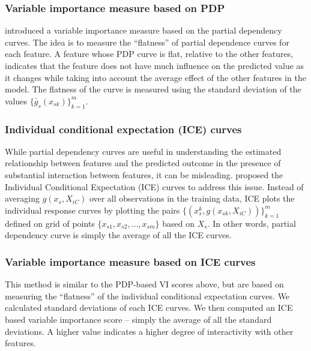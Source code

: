 \documentclass[11pt,a4paper,]{article}
\begin{document}
\subsubsection{Variable importance measure based on
PDP}\label{variable-importance-measure-based-on-pdp}

\textcite{Greenwell2018} introduced a variable importance measure based
on the partial dependency curves. The idea is to measure the
``flatness'' of partial dependence curves for each feature. A feature
whose PDP curve is flat, relative to the other features, indicates that
the feature does not have much influence on the predicted value as it
changes while taking into account the average effect of the other
features in the model. The flatness of the curve is measured using the
standard deviation of the values \(\{\bar{g}_{s}(x_{sk})\}_{k=1}^{m}\).

\subsubsection{Individual conditional expectation (ICE)
curves}\label{individual-conditional-expectation-ice-curves}

While partial dependency curves are useful in understanding the
estimated relationship between features and the predicted outcome in the
presence of substantial interaction between features, it can be
misleading. \textcite{goldstein2015peeking} proposed the Individual
Conditional Expectation (ICE) curves to address this issue. Instead of
averaging \(g(x_s, X_{iC})\) over all observations in the training data,
ICE plots the individual response curves by plotting the pairs
\(\{(x_s^k, g(x_{sk}, X_{iC}))\}_{k=1}^{m}\) defined on grid of points
\(\{x_{s1}, x_{s2},\dots, x_{sm}\}\) based on \(X_s\). In other words,
partial dependency curve is simply the average of all the ICE curves.

\subsubsection{Variable importance measure based on ICE
curves}\label{variable-importance-measure-based-on-ice-curves}

This method is similar to the PDP-based VI scores above, but are based
on measuring the ``flatness'' of the individual conditional expectation
curves. We calculated standard deviations of each ICE curves. We then
computed an ICE based variable importance score -- simply the average of
all the standard deviations. A higher value indicates a higher degree of
interactivity with other features.
\end{document}
